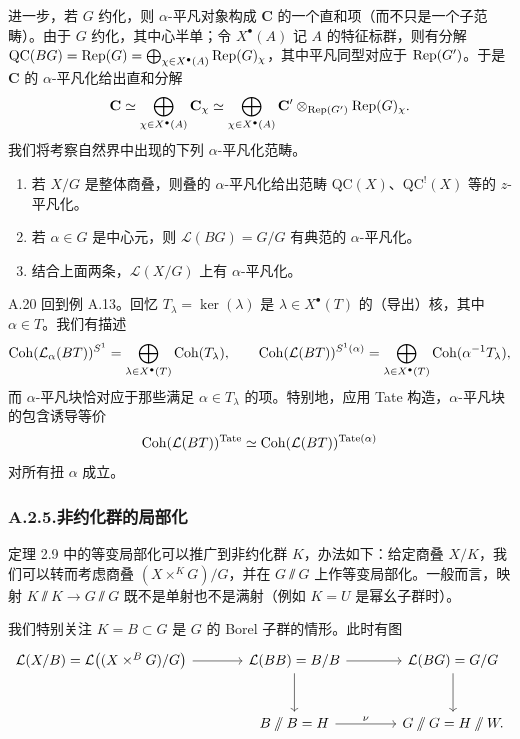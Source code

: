 进一步，若 $G$ 约化，则 $\alpha$-平凡对象构成 $\mathbf C$ 的一个直和项（而不只是一个子范畴）。由于 $G$ 约化，其中心半单；令 $X^\bullet(A)$ 记 $A$ 的特征标群，则有分解 $\mathrm{QC}(BG)=\operatorname{Rep}(G)=\bigoplus_{\chi\in X^\bullet(A)}\operatorname{Rep}(G)_\chi$，其中平凡同型对应于 $\operatorname{Rep}(G')$。于是 $\mathbf C$ 的 $\alpha$-平凡化给出直和分解
\[
\mathbf C\simeq\bigoplus_{\chi\in X^\bullet(A)}\mathbf C_\chi
\simeq\bigoplus_{\chi\in X^\bullet(A)}\mathbf C'\otimes_{\operatorname{Rep}(G')}\operatorname{Rep}(G)_\chi.
\]
我们将考察自然界中出现的下列 $\alpha$-平凡化范畴。
\begin{enumerate}[(1)]
\item 若 $X/G$ 是整体商叠，则叠的 $\alpha$-平凡化给出范畴 $\mathrm{QC}(X)$、$\mathrm{QC}^{!}(X)$ 等的 $z$-平凡化。
\item 若 $\alpha\in G$ 是中心元，则 $\mathcal L(BG)=G/G$ 有典范的 $\alpha$-平凡化。
\item 结合上面两条，$\mathcal L(X/G)$ 上有 $\alpha$-平凡化。
\end{enumerate}

\begin{exam}{A.20}\label{exam:a5-04-14}
回到例 A.13。回忆 $T_\lambda=\ker(\lambda)$ 是 $\lambda\in X^\bullet(T)$ 的（导出）核，其中 $\alpha\in T$。我们有描述
\[
\operatorname{Coh}(\mathcal L_\alpha(BT))^{S^1}=\bigoplus_{\lambda\in X^\bullet(T)}\operatorname{Coh}(T_\lambda),\qquad
\operatorname{Coh}(\mathcal L(BT))^{S^1(\alpha)}=\bigoplus_{\lambda\in X^\bullet(T)}\operatorname{Coh}(\alpha^{-1}T_\lambda),
\]
而 $\alpha$-平凡块恰对应于那些满足 $\alpha\in T_\lambda$ 的项。特别地，应用 Tate 构造，$\alpha$-平凡块的包含诱导等价
\[
\operatorname{Coh}(\mathcal L(BT))^{\mathrm{Tate}}\simeq\operatorname{Coh}(\mathcal L(BT))^{\mathrm{Tate}(\alpha)}
\]
对所有扭 $\alpha$ 成立。
\end{exam}


\subsubsection*{A.2.5.\quad 非约化群的局部化}

定理 2.9 中的等变局部化可以推广到非约化群 $K$，办法如下：给定商叠 $X/K$，我们可以转而考虑商叠 $(X\times^K G)/G$，并在 $G\sslash G$ 上作等变局部化。一般而言，映射 $K\sslash K\to G\sslash G$ 既不是单射也不是满射（例如 $K=U$ 是幂幺子群时）。

我们特别关注 $K=B\subset G$ 是 $G$ 的 Borel 子群的情形。此时有图
\[
\begin{tikzcd}[column sep=large,row sep=large]
\mathcal L(X/B)=\mathcal L\bigl((X\times^B G)/G\bigr) \arrow[r] & \mathcal L(BB)=B/B \arrow[r] \arrow[d] & \mathcal L(BG)=G/G \arrow[d]\\
& B\sslash B=H \arrow[r,"\nu"] & G\sslash G=H\sslash W.
\end{tikzcd}
\]

